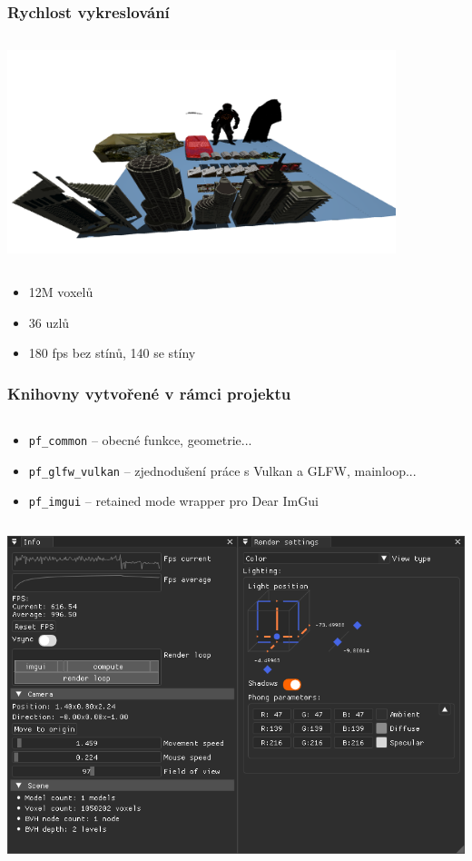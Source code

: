 \documentclass[10pt,xcolor=pdflatex,hyperref={unicode},aspectratio=169]{beamer}
\begin{document}
\begin{frame}\frametitle{Rychlost vykreslování}
    \begin{column}{\textwidth}
        \begin{center}
            \includegraphics[width=0.85\textwidth]{img/big_scene.png}
        \end{center}
    \end{column}
    \begin{itemize}
        \item 12M voxelů
        \item 36 uzlů
        \item 180 fps bez stínů, 140 se stíny
    \end{itemize}
\end{frame}

\begin{frame}\frametitle{Knihovny vytvořené v rámci projektu}
    \begin{column}{0.5\textwidth}
        \begin{itemize}
            \item \texttt{pf\_common} -- obecné funkce, geometrie...
            \item \texttt{pf\_glfw\_vulkan} -- zjednodušení práce s Vulkan a GLFW, mainloop...
            \item \texttt{pf\_imgui} -- retained mode wrapper pro Dear ImGui
        \end{itemize}
    \end{column}
    \begin{column}{0.5\textwidth}
        \includegraphics[width=\textwidth]{img/pf_imgui.png}
    \end{column}
\end{frame}
\end{document}
